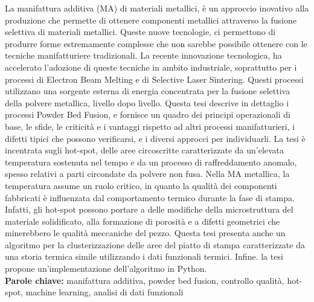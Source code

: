 La manifattura additiva (MA) di materiali metallici, è un approccio inovativo alla produzione che permette di ottenere componenti metallici attraverso la fusione selettiva di materiali metallici. Queste nuove tecnologie, ci permettono di produrre forme estremamente complesse che non sarebbe possibile ottenere con le tecniche manifatturiere tradizionali. La recente innovazione tecnologica, ha accelerato l'adozione di queste tecniche in ambito industriale, soprattutto per i processi di Electron Beam Melting e di Selective Laser Sintering. Questi processi utilizzano una sorgente esterna di energia concentrata per la fusione selettiva della polvere metallica, livello dopo livello. Questa tesi descrive in dettaglio i processi Powder Bed Fusion, e fornisce un quadro dei principi operazionali di base, le sfide, le criticità e i vantaggi rispetto ad altri processi manifatturieri, i difetti tipici che possono verificarsi, e i diversi approcci per individuarli. La tesi è incentrata sugli hot-spot, delle aree circoscritte caratterizzate da un'elevata temperatura sostenuta nel tempo e da un processo di raffreddamento anomalo, spesso relativi a parti circondate da polvere non fusa. Nella MA metallica, la temperatura assume un ruolo critico, in quanto la qualità dei componenti fabbricati è influenzata dal comportamento termico durante la fase di stampa. Infatti, gli hot-spot possono portare a delle modifiche della microstruttura del materiale solidificato, alla formazione di porosità e a difetti geometrici che minerebbero le qualità meccaniche del pezzo. Questa tesi presenta anche un algoritmo per la clusterizzazione delle aree del piatto di stampa caratterizzate da una storia termica simile utilizzando i dati funzionali termici. Infine. la tesi propone un'implementazione dell'algoritmo in Python.
\\[0.5cm]
\textbf{Parole chiave:} manifattura additiva, powder bed fusion, controllo qualità, hot-spot, machine learning, analisi di dati funzionali %

